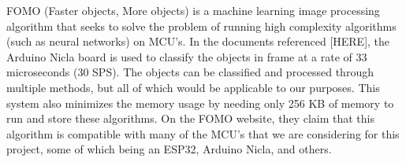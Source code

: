 \newline 
\noindent FOMO (Faster objects, More objects) is a machine learning image processing algorithm that seeks to solve the problem of running high complexity algorithms (such as neural networks) on MCU's. In the documents referenced [HERE], the Arduino Nicla board is used to classify the objects in frame at a rate of 33 microseconds (30 SPS). The objects can be classified and processed through multiple methods, but all of which would be applicable to our purposes. This system also minimizes the memory usage by needing only 256 KB of memory to run and store these algorithms. On the FOMO website, they claim that this algorithm is compatible with many of the MCU's that we are considering for this project, some of which being an ESP32, Arduino Nicla, and others.
\newline 


